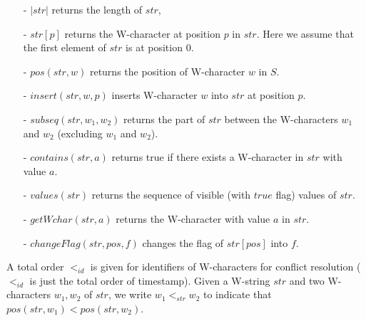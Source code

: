 \begin{itemize}
\setlength{\itemsep}{0.5pt}
\item[-] $\vert str \vert$ returns the length of $str$,

\item[-] $str[p]$ returns the W-character at position $p$ in $str$. Here we assume that the first element of $str$ is at position 0.

\item[-] $pos(str,w)$ returns the position of W-character $w$ in $S$.

\item[-] $insert(str,w,p)$ inserts W-character $w$ into $str$ at position $p$.

\item[-] $subseq(str,w_1,w_2)$ returns the part of $str$ between the W-characters $w_1$ and $w_2$ (excluding $w_1$ and $w_2$).

\item[-] $contains(str,a)$ returns true if there exists a W-character in $str$ with value $a$.

\item[-] $values(str)$ returns the sequence of visible (with $\mathit{true}$ flag) values of $str$.

\item[-] $getWchar(str,a)$ returns the W-character with value $a$ in $str$.

\item[-] $changeFlag(str,pos,f)$ changes the flag of $str[pos]$ into $f$.
\end{itemize}


A total order $<_{id}$ is given for identifiers of W-characters for conflict resolution ($<_{id}$ is just the total order of timestamp). Given a W-string $str$ and two W-characters $w_1,w_2$ of $str$, we write $w_1 <_{str} w_2$ to indicate that $pos(str,w_1) < pos(str,w_2)$.


